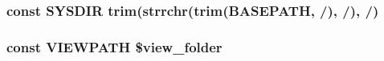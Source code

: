 \subsubsection[{S\+Y\+S\+D\+I\+R}]{\setlength{\rightskip}{0pt plus 5cm}const S\+Y\+S\+D\+I\+R trim(strrchr(trim({\bf B\+A\+S\+E\+P\+A\+T\+H}, \textquotesingle{}/\textquotesingle{}), \textquotesingle{}/\textquotesingle{}), \textquotesingle{}/\textquotesingle{})}\label{index_8php_ab645ae0961792b1f2b4b83f89cb95fa5}
\hypertarget{index_8php_ade8921d52af58583e5727833459224c3}{}
\subsubsection[{V\+I\+E\+W\+P\+A\+T\+H}]{\setlength{\rightskip}{0pt plus 5cm}const V\+I\+E\+W\+P\+A\+T\+H \$view\+\_\+folder}\label{index_8php_ade8921d52af58583e5727833459224c3}
